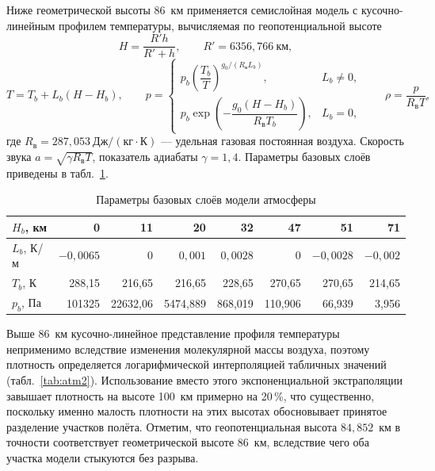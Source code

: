 \documentclass[11pt,a4paper]{article}
\begin{document}
Ниже геометрической высоты 86~км применяется семислойная модель с кусочно-линейным
профилем температуры, вычисляемая по геопотенциальной высоте
\begin{equation}
H = \frac{R' h}{R'+h},
\qquad R'=6356{,}766\ \text{км},
\end{equation}
\begin{equation}
T = T_b + L_b (H - H_b),
\qquad
p = \begin{cases}
p_b\left(\dfrac{T_b}{T}\right)^{g_0/(R_{\text{в}}L_b)}, & L_b \neq 0,\\[2ex]
p_b\exp\!\left(-\dfrac{g_0 (H-H_b)}{R_{\text{в}}T_b}\right), & L_b = 0,
\end{cases}
\qquad \rho = \frac{p}{R_{\text{в}}T},
\end{equation}
где $R_{\text{в}}=287{,}053\ \text{Дж}/(\text{кг}\cdot\text{К})$ — удельная
газовая постоянная воздуха. Скорость звука $a=\sqrt{\gamma R_{\text{в}}T}$,
показатель адиабаты $\gamma=1{,}4$. Параметры базовых слоёв приведены в
табл.~\ref{tab:atm}.

\begin{table}[htb]
\centering
\caption{Параметры базовых слоёв модели атмосферы}
\label{tab:atm}
\begin{tabular}{lrrrrrrr}
\toprule
$H_b$, км & 0 & 11 & 20 & 32 & 47 & 51 & 71 \\
\midrule
$L_b$, К/м & $-0{,}0065$ & 0 & $0{,}001$ & $0{,}0028$ & 0 & $-0{,}0028$ & $-0{,}002$ \\
$T_b$, К & 288{,}15 & 216{,}65 & 216{,}65 & 228{,}65 & 270{,}65 & 270{,}65 & 214{,}65 \\
$p_b$, Па & 101325 & 22632{,}06 & 5474{,}889 & 868{,}019 & 110{,}906 & 66{,}939 & 3{,}956 \\
\bottomrule
\end{tabular}
\end{table}

Выше 86~км кусочно-линейное представление профиля температуры неприменимо
вследствие изменения молекулярной массы воздуха, поэтому плотность определяется
логарифмической интерполяцией табличных значений (табл.~\ref{tab:atm2}).
Использование вместо этого экспоненциальной экстраполяции завышает плотность на
высоте 100~км примерно на 20\,\%, что существенно, поскольку именно малость
плотности на этих высотах обосновывает принятое разделение участков полёта.
Отметим, что геопотенциальная высота $84{,}852$~км в точности соответствует
геометрической высоте 86~км, вследствие чего оба участка модели стыкуются без
разрыва.
\end{document}
